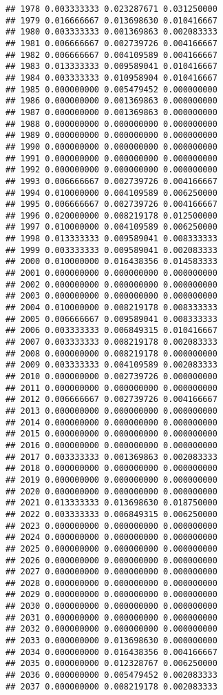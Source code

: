 \documentclass[
]{article}
\begin{document}
\begin{verbatim}
## 1978 0.003333333 0.023287671 0.031250000
## 1979 0.016666667 0.013698630 0.010416667
## 1980 0.003333333 0.001369863 0.002083333
## 1981 0.006666667 0.002739726 0.004166667
## 1982 0.006666667 0.004109589 0.004166667
## 1983 0.013333333 0.009589041 0.010416667
## 1984 0.003333333 0.010958904 0.010416667
## 1985 0.000000000 0.005479452 0.000000000
## 1986 0.000000000 0.001369863 0.000000000
## 1987 0.000000000 0.001369863 0.000000000
## 1988 0.000000000 0.000000000 0.000000000
## 1989 0.000000000 0.000000000 0.000000000
## 1990 0.000000000 0.000000000 0.000000000
## 1991 0.000000000 0.000000000 0.000000000
## 1992 0.000000000 0.000000000 0.000000000
## 1993 0.006666667 0.002739726 0.004166667
## 1994 0.010000000 0.004109589 0.006250000
## 1995 0.006666667 0.002739726 0.004166667
## 1996 0.020000000 0.008219178 0.012500000
## 1997 0.010000000 0.004109589 0.006250000
## 1998 0.013333333 0.009589041 0.008333333
## 1999 0.003333333 0.009589041 0.002083333
## 2000 0.010000000 0.016438356 0.014583333
## 2001 0.000000000 0.000000000 0.000000000
## 2002 0.000000000 0.000000000 0.000000000
## 2003 0.000000000 0.000000000 0.000000000
## 2004 0.010000000 0.008219178 0.008333333
## 2005 0.006666667 0.009589041 0.008333333
## 2006 0.003333333 0.006849315 0.010416667
## 2007 0.003333333 0.008219178 0.002083333
## 2008 0.000000000 0.008219178 0.000000000
## 2009 0.003333333 0.004109589 0.002083333
## 2010 0.000000000 0.002739726 0.000000000
## 2011 0.000000000 0.000000000 0.000000000
## 2012 0.006666667 0.002739726 0.004166667
## 2013 0.000000000 0.000000000 0.000000000
## 2014 0.000000000 0.000000000 0.000000000
## 2015 0.000000000 0.000000000 0.000000000
## 2016 0.000000000 0.000000000 0.000000000
## 2017 0.003333333 0.001369863 0.002083333
## 2018 0.000000000 0.000000000 0.000000000
## 2019 0.000000000 0.000000000 0.000000000
## 2020 0.000000000 0.000000000 0.000000000
## 2021 0.013333333 0.013698630 0.018750000
## 2022 0.003333333 0.006849315 0.006250000
## 2023 0.000000000 0.000000000 0.000000000
## 2024 0.000000000 0.000000000 0.000000000
## 2025 0.000000000 0.000000000 0.000000000
## 2026 0.000000000 0.000000000 0.000000000
## 2027 0.000000000 0.000000000 0.000000000
## 2028 0.000000000 0.000000000 0.000000000
## 2029 0.000000000 0.000000000 0.000000000
## 2030 0.000000000 0.000000000 0.000000000
## 2031 0.000000000 0.000000000 0.000000000
## 2032 0.000000000 0.000000000 0.000000000
## 2033 0.000000000 0.013698630 0.000000000
## 2034 0.000000000 0.016438356 0.004166667
## 2035 0.000000000 0.012328767 0.006250000
## 2036 0.000000000 0.005479452 0.002083333
## 2037 0.000000000 0.008219178 0.002083333

\end{verbatim}
\end{document}

